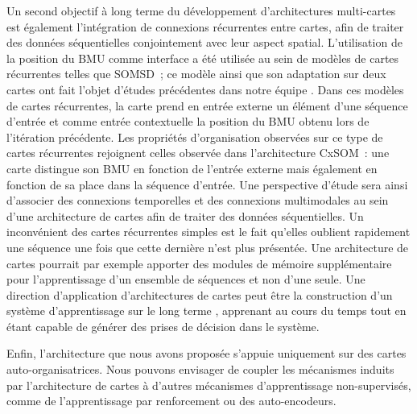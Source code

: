 Un second objectif à long terme du développement d'architectures multi-cartes est également l'intégration de connexions récurrentes entre cartes, afin de traiter des données séquentielles conjointement avec leur aspect spatial. 
L'utilisation de la position du BMU comme interface a été utilisée au sein de modèles de cartes récurrentes telles que SOMSD~; ce modèle ainsi que son adaptation sur deux cartes ont fait l'objet d'études précédentes dans notre équipe \cite{baheux_towards_2014, fix20}. 
Dans ces modèles de cartes récurrentes, la carte prend en entrée externe un élément d'une séquence d'entrée et comme entrée contextuelle la position du BMU obtenu lors de l'itération précédente.
Les propriétés d'organisation observées sur ce type de cartes récurrentes rejoignent celles observée dans l'architecture CxSOM~: une carte distingue son BMU en fonction de l'entrée externe mais également en fonction de sa place dans la séquence d'entrée.
Une perspective d'étude sera ainsi d'associer des connexions temporelles et des connexions multimodales au sein d'une architecture de cartes afin de traiter des données séquentielles.
Un inconvénient des cartes récurrentes simples est le fait qu'elles oublient rapidement une séquence une fois que cette dernière n'est plus présentée. 
Une architecture de cartes pourrait par exemple apporter des modules de mémoire supplémentaire pour l'apprentissage d'un ensemble de séquences et non d'une seule.
Une direction d'application d'architectures de cartes peut être la construction d'un système d'apprentissage \og sur le long terme \fg{}, apprenant au cours du temps tout en étant capable de générer des prises de décision dans le système.


Enfin, l'architecture que nous avons proposée s'appuie uniquement sur des cartes auto-organisatrices. Nous pouvons envisager de coupler les mécanismes induits par l'architecture de cartes à d'autres mécanismes d'apprentissage non-supervisés, comme de l'apprentissage par renforcement ou des auto-encodeurs.